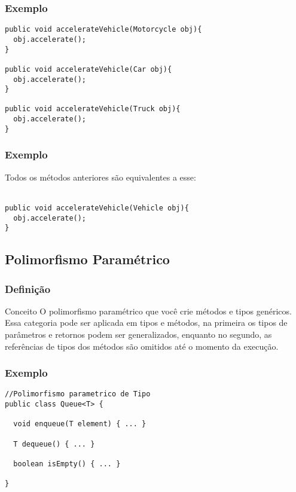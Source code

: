 \begin{frame}[fragile]
\frametitle{Exemplo}
\justifying
\begin{lstlisting}
public void accelerateVehicle(Motorcycle obj){
  obj.accelerate();
}

public void accelerateVehicle(Car obj){
  obj.accelerate();
}

public void accelerateVehicle(Truck obj){
  obj.accelerate();
}
\end{lstlisting}
\end{frame}

\begin{frame}[fragile]
\frametitle{Exemplo}
\justifying
\quad Todos os métodos anteriores são equivalentes a esse:
\\~\\
\begin{lstlisting}
public void accelerateVehicle(Vehicle obj){
  obj.accelerate();
}
\end{lstlisting}
\end{frame}


\subsection{Polimorfismo Paramétrico}

\begin{frame}
\frametitle{Definição}
\justifying
\begin{block}{Conceito}
\qquad O polimorfismo paramétrico que você crie métodos e tipos genéricos. 
Essa categoria pode ser aplicada em tipos e métodos, na primeira os tipos de parâmetros e retornos podem ser generalizados, enquanto no segundo, as referências de tipos dos métodos são omitidos até o momento da execução.
\end{block}
\end{frame}

\begin{frame}[fragile]
\frametitle{Exemplo}
\justifying
\begin{lstlisting}
//Polimorfismo parametrico de Tipo
public class Queue<T> {
	
  void enqueue(T element) { ... }

  T dequeue() { ... }

  boolean isEmpty() { ... }

}
\end{lstlisting}
\end{frame}

